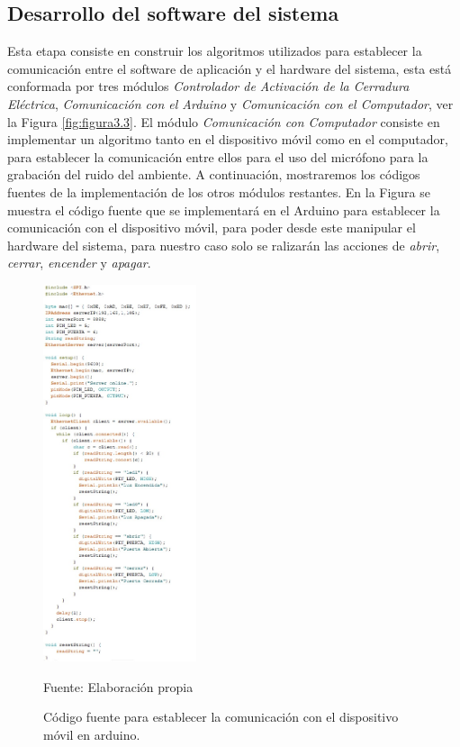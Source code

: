\newpage
\subsection{Desarrollo del software del sistema}
Esta etapa consiste en construir los algoritmos utilizados para establecer la comunicación entre el software de aplicación y el hardware del sistema, esta está conformada por tres módulos \textit{Controlador de Activación de la Cerradura Eléctrica}, \textit{Comunicación con el Arduino} y \textit{Comunicación con el Computador}, ver la Figura \ref{fig:figura3.3}.
\vskip 0.5cm
El módulo \textit{Comunicación con Computador} consiste en implementar un algoritmo tanto en el dispositivo móvil como en el computador, para establecer la comunicación entre ellos para el uso del micrófono para la grabación del ruido del ambiente. A continuación, mostraremos los códigos fuentes de la implementación de los otros módulos restantes.
\vskip 0.5cm
En la Figura se muestra el código fuente que se implementará en el Arduino para establecer la comunicación con el dispositivo móvil, para poder desde este manipular el hardware del sistema, para nuestro caso solo se ralizarán las acciones de \textit{abrir}, \textit{cerrar}, \textit{encender} y \textit{apagar}.

\begin{figure}[H]
\captionsetup{justification=centering}
\begin{center}
\includegraphics[width=0.4\textwidth]{Imagenes/Cap3/image062}
\end{center}
\begin{center}
\vskip -0.5cm
\caption{\small{Código fuente para establecer la comunicación con el dispositivo móvil en arduino.}}
\label{fig:figura3.62}
{\small{Fuente: Elaboración propia}}
\end{center}
\end{figure}


